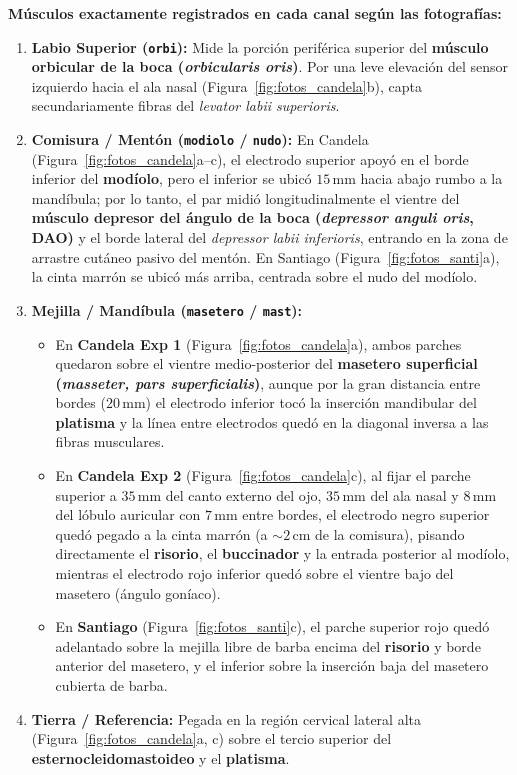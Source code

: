 \documentclass[11pt, a4paper]{article}
\begin{document}
\noindent \textbf{Músculos exactamente registrados en cada canal según las fotografías:}
\begin{enumerate}\setlength{\itemsep}{2pt}
    \item \textbf{Labio Superior (\texttt{orbi}):} Mide la porción periférica superior del \textbf{músculo orbicular de la boca (\textit{orbicularis oris})}. Por una leve elevación del sensor izquierdo hacia el ala nasal (Figura~\ref{fig:fotos_candela}b), capta secundariamente fibras del \textit{levator labii superioris}.
    \item \textbf{Comisura / Mentón (\texttt{modiolo} / \texttt{nudo}):} En Candela (Figura~\ref{fig:fotos_candela}a--c), el electrodo superior apoyó en el borde inferior del \textbf{modíolo}, pero el inferior se ubicó $15\,\text{mm}$ hacia abajo rumbo a la mandíbula; por lo tanto, el par midió longitudinalmente el vientre del \textbf{músculo depresor del ángulo de la boca (\textit{depressor anguli oris}, DAO)} y el borde lateral del \textit{depressor labii inferioris}, entrando en la zona de arrastre cutáneo pasivo del mentón. En Santiago (Figura~\ref{fig:fotos_santi}a), la cinta marrón se ubicó más arriba, centrada sobre el nudo del modíolo.
    \item \textbf{Mejilla / Mandíbula (\texttt{masetero} / \texttt{mast}):}
    \begin{itemize}\setlength{\itemsep}{1pt}
        \item En \textbf{Candela Exp 1} (Figura~\ref{fig:fotos_candela}a), ambos parches quedaron sobre el vientre medio-posterior del \textbf{masetero superficial (\textit{masseter, pars superficialis})}, aunque por la gran distancia entre bordes ($20\,\text{mm}$) el electrodo inferior tocó la inserción mandibular del \textbf{platisma} y la línea entre electrodos quedó en la diagonal inversa a las fibras musculares.
        \item En \textbf{Candela Exp 2} (Figura~\ref{fig:fotos_candela}c), al fijar el parche superior a $35\,\text{mm}$ del canto externo del ojo, $35\,\text{mm}$ del ala nasal y $8\,\text{mm}$ del lóbulo auricular con $7\,\text{mm}$ entre bordes, el electrodo negro superior quedó pegado a la cinta marrón (a $\sim 2\,\text{cm}$ de la comisura), pisando directamente el \textbf{risorio}, el \textbf{buccinador} y la entrada posterior al modíolo, mientras el electrodo rojo inferior quedó sobre el vientre bajo del masetero (ángulo goníaco).
        \item En \textbf{Santiago} (Figura~\ref{fig:fotos_santi}c), el parche superior rojo quedó adelantado sobre la mejilla libre de barba encima del \textbf{risorio} y borde anterior del masetero, y el inferior sobre la inserción baja del masetero cubierta de barba.
    \end{itemize}
    \item \textbf{Tierra / Referencia:} Pegada en la región cervical lateral alta (Figura~\ref{fig:fotos_candela}a, c) sobre el tercio superior del \textbf{esternocleidomastoideo} y el \textbf{platisma}.
\end{enumerate}
\end{document}
